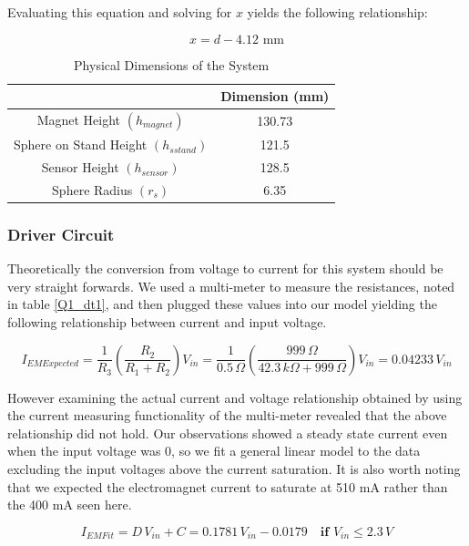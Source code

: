 \documentclass{article}
\theoremstyle{plain}
\theoremstyle{definition}
\theoremstyle{remark}
\begin{document}
Evaluating this equation and solving for $x$ yields the following relationship:

$$ x = d - 4.12 \text{ mm} $$

\begin{table}
\begin{center}
    \begin{tabular}{|c|c|}
        \hline
        ~                                    & Dimension (mm) \\ \hline
        Magnet Height $(h_{magnet}) $          & 130.73         \\ 
        Sphere on Stand Height $(h_{s stand})$ & 121.5          \\ 
        Sensor Height $(h_{sensor})$           & 128.5          \\ 
        Sphere Radius $(r_{s})$                & 6.35           \\
        \hline
    \end{tabular}
\end{center}
\caption{Physical Dimensions of the System}
\label{Q1_dt2}
\end{table}

\subsubsection*{Driver Circuit}

Theoretically the conversion from voltage to current for this system should be very straight forwards.  We used a multi-meter to measure the resistances, noted in table \ref{Q1_dt1}, and then plugged these values into our model yielding the following relationship between current and input voltage.

$$ I_{EM Expected}=\frac{1}{R_3}\left(\frac{R_2}{R_1+R_2}\right)V_{in} = \frac{1}{0.5 \,\Omega}\left(\frac{999 \,\Omega}{42.3 \,k\Omega + 999 \,\Omega}\right)V_{in} = 0.04233 \, V_{in}$$

However examining the actual current and voltage relationship obtained by using the current measuring functionality of the multi-meter revealed that the above relationship did not hold.  Our observations showed a steady state current even when the input voltage was 0, so we fit a general linear model to the data excluding the input voltages above the current saturation.  It is also worth noting that we expected the electromagnet current to saturate at 510 mA rather than the 400 mA seen here.

$$ I_{EM Fit} = D \, V_{in} + C = 0.1781 \, V_{in} - 0.0179  \quad \textbf{if } V_{in} \leq 2.3 \, V $$
\end{document}
